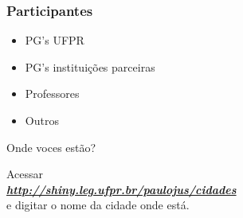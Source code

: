 \documentclass[handout,serif, professionalfont, usenames, dvipsnames, aspectratio = 169]{beamer}\usepackage[]{graphicx}\usepackage[]{color}
\begin{document}
\begin{frame}[plain]
  \frametitle{Participantes}

\begin{itemize}
\item PG's UFPR
\item PG's instituições parceiras
\item Professores
\item Outros
\end{itemize}

\vspace{0.5cm}
\pause
\LARGE{Onde voces estão?}

\vspace{0.5cm}

Acessar \\
\textit{\href{http://shiny.leg.ufpr.br/paulojus/cidades}{\bf http://shiny.leg.ufpr.br/paulojus/cidades}}\\
      e digitar o nome da cidade onde está.

\end{frame}



%  
%  
\end{document}

